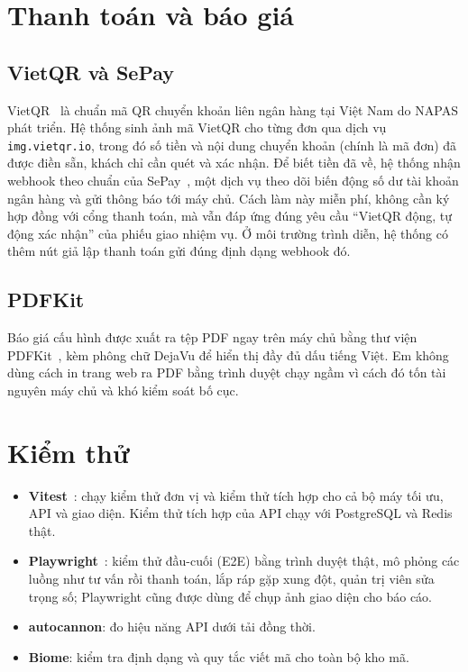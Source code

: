 \section{Thanh toán và báo giá}

\subsection{VietQR và SePay}

VietQR~\cite{vietqr} là chuẩn mã QR chuyển khoản liên ngân hàng tại Việt Nam do NAPAS phát triển. Hệ thống sinh ảnh mã VietQR cho từng đơn qua dịch vụ \texttt{img.vietqr.io}, trong đó số tiền và nội dung chuyển khoản (chính là mã đơn) đã được điền sẵn, khách chỉ cần quét và xác nhận. Để biết tiền đã về, hệ thống nhận webhook theo chuẩn của SePay~\cite{sepay}, một dịch vụ theo dõi biến động số dư tài khoản ngân hàng và gửi thông báo tới máy chủ. Cách làm này miễn phí, không cần ký hợp đồng với cổng thanh toán, mà vẫn đáp ứng đúng yêu cầu ``VietQR động, tự động xác nhận'' của phiếu giao nhiệm vụ. Ở môi trường trình diễn, hệ thống có thêm nút giả lập thanh toán gửi đúng định dạng webhook đó.

\subsection{PDFKit}

Báo giá cấu hình được xuất ra tệp PDF ngay trên máy chủ bằng thư viện PDFKit~\cite{pdfkit}, kèm phông chữ DejaVu để hiển thị đầy đủ dấu tiếng Việt. Em không dùng cách in trang web ra PDF bằng trình duyệt chạy ngầm vì cách đó tốn tài nguyên máy chủ và khó kiểm soát bố cục.

\section{Kiểm thử}

\begin{itemize}
  \item \textbf{Vitest}~\cite{vitest}: chạy kiểm thử đơn vị và kiểm thử tích hợp cho cả bộ máy tối ưu, API và giao diện. Kiểm thử tích hợp của API chạy với PostgreSQL và Redis thật.
  \item \textbf{Playwright}~\cite{playwright}: kiểm thử đầu-cuối (E2E) bằng trình duyệt thật, mô phỏng các luồng như tư vấn rồi thanh toán, lắp ráp gặp xung đột, quản trị viên sửa trọng số; Playwright cũng được dùng để chụp ảnh giao diện cho báo cáo.
  \item \textbf{autocannon}: đo hiệu năng API dưới tải đồng thời.
  \item \textbf{Biome}: kiểm tra định dạng và quy tắc viết mã cho toàn bộ kho mã.
\end{itemize}

